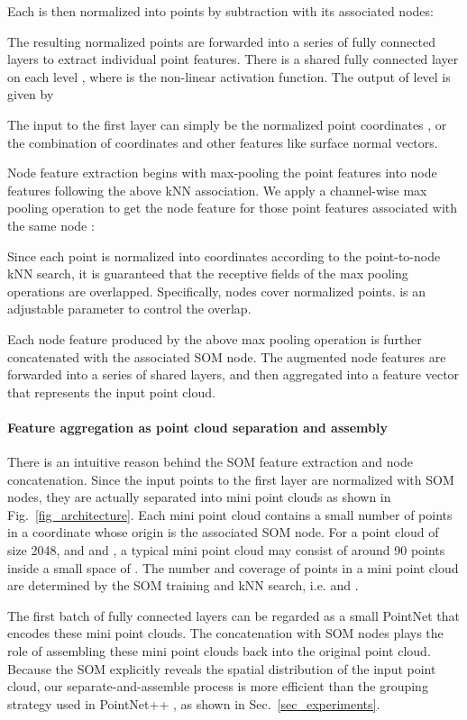 \documentclass[10pt,twocolumn,letterpaper]{article}
\begin{document}
\noindent Each  is then normalized into  points by subtraction with its associated nodes:


\noindent The resulting  normalized points are forwarded into a series of fully connected layers to extract individual point features. There is a shared fully connected layer on each level , where  is the non-linear activation function. The output of level  is given by


\noindent The input to the first layer  can simply be the normalized point coordinates , or the combination of coordinates and other features like surface normal vectors.

Node feature extraction begins with max-pooling the  point features into  node features following the above kNN association. We apply a channel-wise max pooling operation to get the node feature  for those point features associated with the same node :

Since each point is normalized into  coordinates according to the point-to-node kNN search, it is guaranteed that the receptive fields of the  max pooling operations are overlapped. Specifically,  nodes cover  normalized points.  is an adjustable parameter to control the overlap. 

Each node feature produced by the above max pooling operation is further concatenated with the associated SOM node. The  augmented node features are forwarded into a series of shared layers, and then aggregated into a feature vector that represents the input point cloud.

\paragraph{Feature aggregation as point cloud separation and assembly}
There is an intuitive reason behind the SOM feature extraction and node concatenation. Since the input points to the first layer are normalized with  SOM nodes, they are actually separated into  mini point clouds as shown in Fig.~\ref{fig_architecture}. Each mini point cloud contains a small number of points in a coordinate whose origin is the associated SOM node. For a point cloud of size 2048, and  and , a typical mini point cloud may consist of around 90 points inside a small space of . The number and coverage of points in a mini point cloud are determined by the SOM training and kNN search, i.e.  and . 

The first batch of fully connected layers can be regarded as a small PointNet that encodes these mini point clouds. The concatenation with SOM nodes plays the role of assembling these mini point clouds back into the original point cloud. Because the SOM explicitly reveals the spatial distribution of the input point cloud, our separate-and-assemble process is more efficient than the grouping strategy used in PointNet++ \cite{qi2017pointnet++}, as shown in Sec.~\ref{sec_experiments}.
\end{document}

